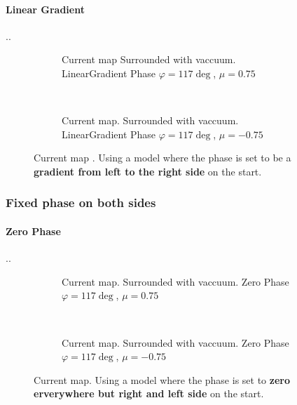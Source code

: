 \documentclass[../main.tex]{subfiles}
\begin{document}
\paragraph{Linear Gradient}..
\begin{figure}[H]
    \begin{subfigure}{0.4\textwidth}
        \centering
        \hspace{-4cm} %
        
        \caption{Current map Surrounded with vaccuum. LinearGradient Phase $\varphi = 117\deg$, $\mu = 0.75$}
        \label{fig:first}
    \end{subfigure}    \\
    \begin{subfigure}{0.4\textwidth}
        \centering
        \hspace{-4cm} %
        
        \caption{Current map. Surrounded with vaccuum. LinearGradient Phase $\varphi = 117\deg$, $\mu = -0.75$}
        \label{fig:first}
    \end{subfigure}    
    \caption{Current map . Using a model where the phase is set to be a \textbf{gradient from left to the right side} on the start.}
\end{figure}

\subsubsection{Fixed phase on both sides}
\paragraph{Zero Phase}..
\begin{figure}[H]
    \begin{subfigure}{0.4\textwidth}
        \centering
        \hspace{-4cm} %
        
        \caption{Current  map. Surrounded with vaccuum. Zero Phase $\varphi = 117\deg$, $\mu = 0.75$}
        \label{fig:first}
    \end{subfigure}    \\
    \begin{subfigure}{0.4\textwidth}
        \centering
        \hspace{-4cm} %
        
        \caption{Current map. Surrounded with vaccuum. Zero Phase $\varphi = 117\deg$, $\mu = -0.75$}
        \label{fig:first}
    \end{subfigure}    
    \caption{ Current map. Using a model where the phase is set to \textbf{zero erverywhere but right and left side} on the start.}
\end{figure}
\end{document}
